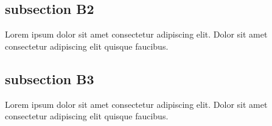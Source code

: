 \documentclass[10pt,a4paper]{article}
\begin{document}
\subsection{subsection B2}
\begin{center}
\begin{lemma}
    Lorem ipsum dolor sit amet consectetur adipiscing elit. Dolor sit amet consectetur adipiscing elit quisque faucibus.
\end{lemma}
\end{center}
\subsection{subsection B3}
\begin{center}
\begin{warning}
    Lorem ipsum dolor sit amet consectetur adipiscing elit. Dolor sit amet consectetur adipiscing elit quisque faucibus.
\end{warning}
\end{center}
\end{document}

